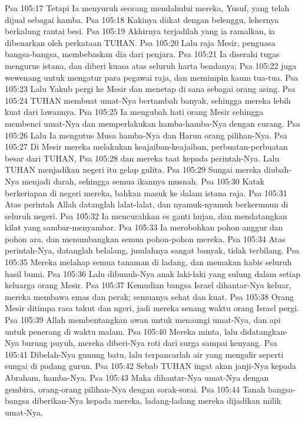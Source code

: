 Psa 105:17  Tetapi Ia menyuruh seorang mendahului mereka, Yusuf, yang telah dijual sebagai hamba.
Psa 105:18  Kakinya diikat dengan belenggu, lehernya berkalung rantai besi.
Psa 105:19  Akhirnya terjadilah yang ia ramalkan, ia dibenarkan oleh perkataan TUHAN.
Psa 105:20  Lalu raja Mesir, penguasa bangsa-bangsa, membebaskan dia dari penjara.
Psa 105:21  Ia diserahi tugas mengurus istana, dan diberi kuasa atas seluruh harta bendanya;
Psa 105:22  juga wewenang untuk mengatur para pegawai raja, dan memimpin kaum tua-tua.
Psa 105:23  Lalu Yakub pergi ke Mesir dan menetap di sana sebagai orang asing.
Psa 105:24  TUHAN membuat umat-Nya bertambah banyak, sehingga mereka lebih kuat dari lawannya.
Psa 105:25  Ia mengubah hati orang Mesir sehingga membenci umat-Nya dan memperlakukan hamba-hamba-Nya dengan curang.
Psa 105:26  Lalu Ia mengutus Musa hamba-Nya dan Harun orang pilihan-Nya.
Psa 105:27  Di Mesir mereka melakukan keajaiban-keajaiban, perbuatan-perbuatan besar dari TUHAN,
Psa 105:28  dan mereka taat kepada perintah-Nya. Lalu TUHAN menjadikan negeri itu gelap gulita.
Psa 105:29  Sungai mereka diubah-Nya menjadi darah, sehingga semua ikannya musnah.
Psa 105:30  Katak berkeriapan di negeri mereka, bahkan masuk ke dalam istana raja.
Psa 105:31  Atas perintah Allah datanglah lalat-lalat, dan nyamuk-nyamuk berkerumun di seluruh negeri.
Psa 105:32  Ia mencurahkan es ganti hujan, dan mendatangkan kilat yang sambar-menyambar.
Psa 105:33  Ia merobohkan pohon anggur dan pohon ara, dan menumbangkan semua pohon-pohon mereka.
Psa 105:34  Atas perintah-Nya, datanglah belalang, jumlahnya sangat banyak, tidak terbilang.
Psa 105:35  Mereka melahap semua tanaman di ladang, dan memakan habis seluruh hasil bumi.
Psa 105:36  Lalu dibunuh-Nya anak laki-laki yang sulung dalam setiap keluarga orang Mesir.
Psa 105:37  Kemudian bangsa Israel dihantar-Nya keluar, mereka membawa emas dan perak; semuanya sehat dan kuat.
Psa 105:38  Orang Mesir ditimpa rasa takut dan ngeri, jadi mereka senang waktu orang Israel pergi.
Psa 105:39  Allah membentangkan awan untuk menaungi umat-Nya, dan api untuk penerang di waktu malam.
Psa 105:40  Mereka minta, lalu didatangkan-Nya burung puyuh, mereka diberi-Nya roti dari surga sampai kenyang.
Psa 105:41  Dibelah-Nya gunung batu, lalu terpancarlah air yang mengalir seperti sungai di padang gurun.
Psa 105:42  Sebab TUHAN ingat akan janji-Nya kepada Abraham, hamba-Nya.
Psa 105:43  Maka dihantar-Nya umat-Nya dengan gembira, orang-orang pilihan-Nya dengan sorak-sorai.
Psa 105:44  Tanah bangsa-bangsa diberikan-Nya kepada mereka, ladang-ladang mereka dijadikan milik umat-Nya,
